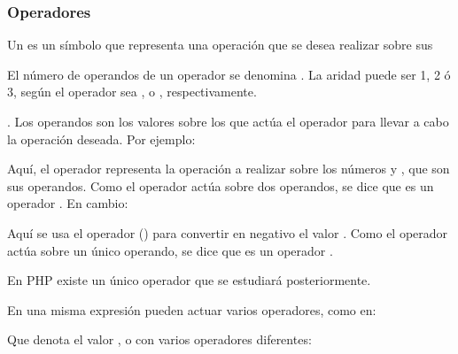 \documentclass[a4paper,12pt,spanish]{sphinxmanual}
\begin{document}
\subsubsection{Operadores}
\label{\detokenize{php:operadores}}
\ignorespaces 
Un  es un símbolo que representa una operación que se desea
realizar sobre sus  %
\begin{footnote}[2]\sphinxAtStartFootnote
El número de operandos de un operador se denomina . La aridad
puede ser 1, 2 ó 3, según el operador sea ,  o ,
respectivamente.
%
\end{footnote}. Los operandos son los valores
sobre los que actúa el operador para llevar a cabo la operación deseada. Por
ejemplo:

\begin{sphinxVerbatim}[commandchars=\\\{\}]
  
\end{sphinxVerbatim}

Aquí, el operador \sphinxcode{+} representa la operación  a realizar sobre los
números  y , que son sus operandos. Como el operador actúa sobre dos
operandos, se dice que es un operador . En cambio:

\begin{sphinxVerbatim}[commandchars=\\\{\}]
\end{sphinxVerbatim}

Aquí se usa el operador \sphinxcode{-} () para convertir en negativo el
valor . Como el operador actúa sobre un único operando, se dice que es un
operador .

En PHP existe un único operador  que se estudiará posteriormente.

En una misma expresión pueden actuar varios operadores, como en:

\begin{sphinxVerbatim}[commandchars=\\\{\}]
    
\end{sphinxVerbatim}

Que denota el valor , o con varios operadores diferentes:
\end{document}
